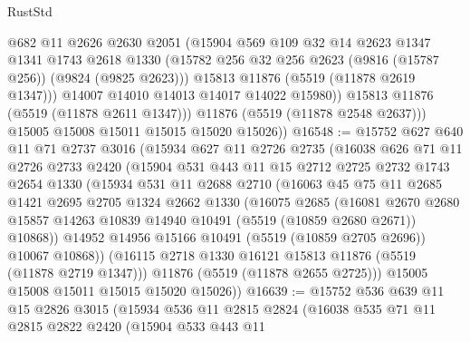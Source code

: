 \begin{lexlean}{RustStd}
\begin{coremodule}
                @682
                @11
                @2626
                @2630
                @2051
                (@15904
                  @569
                  @109
                  @32
                  @14
                  @2623
                  @1347
                  @1341
                  @1743
                  @2618
                  @1330
                  (@15782 @256 @32 @256 @2623 (@9816 (@15787 @256)) (@9824 (@9825 @2623)))
                  @15813
                  @11876
                  (@5519 (@11878 @2619 @1347)))
                @14007
                @14010
                @14013
                @14017
                @14022
                @15980))
            @15813
            @11876
            (@5519 (@11878 @2611 @1347)))
          @11876
          (@5519 (@11878 @2548 @2637)))
        @15005
        @15008
        @15011
        @15015
        @15020
        @15026))
@16548 := @15752
    @627
    @640
    @11
    @71
    @2737
    @3016
    (@15934
      @627
      @11
      @2726
      @2735
      (@16038
        @626
        @71
        @11
        @2726
        @2733
        @2420
        (@15904
          @531
          @443
          @11
          @15
          @2712
          @2725
          @2732
          @1743
          @2654
          @1330
          (@15934
            @531
            @11
            @2688
            @2710
            (@16063
              @45
              @75
              @11
              @2685
              @1421
              @2695
              @2705
              @1324
              @2662
              @1330
              (@16075
                @2685
                (@16081
                  @2670
                  @2680
                  @15857
                  @14263
                  @10839
                  @14940
                  @10491
                  (@5519 (@10859 @2680 @2671))
                  @10868))
              @14952
              @14956
              @15166
              @10491
              (@5519 (@10859 @2705 @2696))
              @10067
              @10868))
          (@16115 @2718 @1330 @16121 @15813 @11876 (@5519 (@11878 @2719 @1347)))
          @11876
          (@5519 (@11878 @2655 @2725)))
        @15005
        @15008
        @15011
        @15015
        @15020
        @15026))
@16639 := @15752
    @536
    @639
    @11
    @15
    @2826
    @3015
    (@15934
      @536
      @11
      @2815
      @2824
      (@16038
        @535
        @71
        @11
        @2815
        @2822
        @2420
        (@15904
          @533
          @443
          @11

\end{coremodule}
\end{lexlean}
